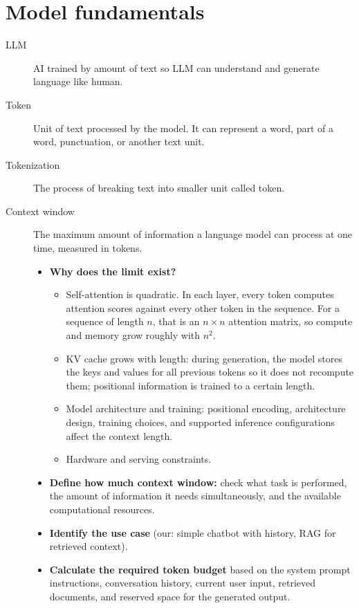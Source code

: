 \documentclass[a4paper,12pt]{report}
\begin{document}
\section{Model fundamentals}
\begin{description}
  \item[LLM] AI trained by amount of text so LLM can understand and generate language like human.

  \item[Token] Unit of text processed by the model. It can represent a word, part of a word, punctuation, or another text unit.

  \item[Tokenization] The process of breaking text into smaller unit called token. 

  \item[Context window] The maximum amount of information a language model can process at one time, measured in tokens.
  \begin{itemize}
    \item \textbf{Why does the limit exist?}
    \begin{itemize}
      \item Self-attention is quadratic. In each layer, every token computes attention scores against every other token in the sequence. For a sequence of length $n$, that is an $n \times n$ attention matrix, so compute and memory grow roughly with $n^2$.
      \item KV cache grows with length: during generation, the model stores the keys and values for all previous tokens so it does not recompute them; positional information is trained to a certain length.
      \item Model architecture and training: positional encoding, architecture design, training choices, and supported inference configurations affect the context length.
      \item Hardware and serving constraints.
    \end{itemize}
    \item \textbf{Define how much context window:} check what task is performed, the amount of information it needs simultaneously, and the available computational resources.
    \item \textbf{Identify the use case} (our: simple chatbot with history, RAG for retrieved context).
    \item \textbf{Calculate the required token budget} based on the system prompt instructions, conversation history, current user input, retrieved documents, and reserved space for the generated output.
  \end{itemize}


\end{description}
\end{document}
